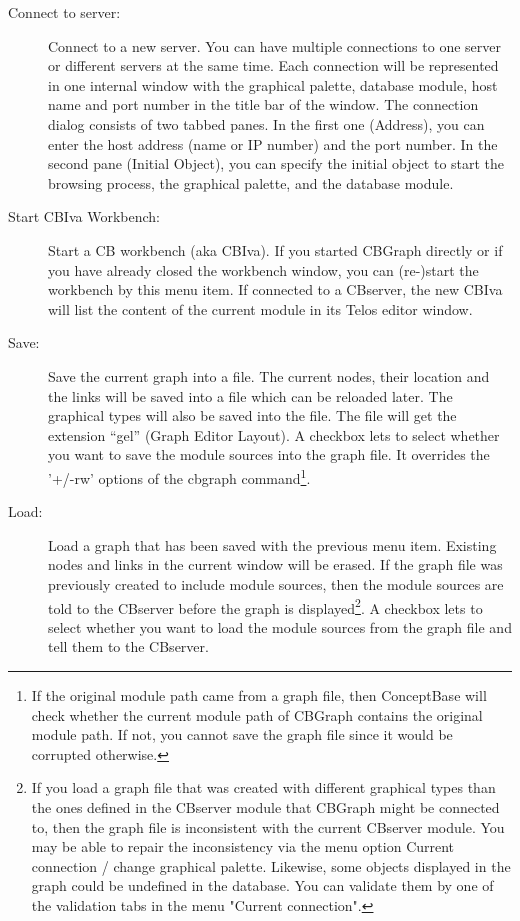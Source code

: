 \begin{description}
\item[Connect to server:] Connect to a new server. You can have
multiple connections to one server or different servers at the same
time. Each connection will be represented in one internal window
with the graphical palette, database module, host name and port number
in the title bar of the window.
The connection dialog consists of two tabbed panes. In the first one
(Address), you can enter the host address (name or IP number) and the
port number. In the second pane (Initial Object), you can specify
the initial object to start the browsing process, the graphical
palette, and the database module.

\item[Start CBIva Workbench:] Start a CB workbench (aka CBIva). If you
started CBGraph directly or if you have already closed
the workbench window, you can (re-)start the workbench by this menu
item. If connected to a CBserver, the new CBIva will list the content
of the current module in its Telos editor window.

\item[Save:] Save the current graph into a file. The current
nodes, their location and the links will be saved into a file which
can be reloaded later. The graphical types will also be saved into the file. 
The file will get the extension ``gel'' (Graph Editor Layout).
A checkbox lets to select whether you want to save the module sources
into the graph file. It overrides the '+/-rw' options of the cbgraph command\footnote{%
If the original module path came from a graph file, then ConceptBase will check whether
the current module path of CBGraph contains the original module path. If not,
you cannot save the graph file since it would be corrupted otherwise.}.

\item[Load:] Load a graph that has been saved with the previous menu
item. Existing nodes and links in the current window will be erased.
If the graph file was previously created to include module sources,
then the module sources are told to the CBserver before the graph is displayed\footnote{
If you load a graph file that was created with different graphical types
than the ones defined in the CBserver module that CBGraph might be connected to,
then the graph file is inconsistent with the current CBserver module.
You may be able to repair the inconsistency via the menu option
Current connection / change graphical palette. Likewise, some objects displayed
in the graph could be undefined in the database. You can validate them by one
of the validation tabs in the menu "Current connection". }.
A checkbox lets to select whether you want to load the module sources from
the graph file and tell them to the CBserver. 


\end{description}

